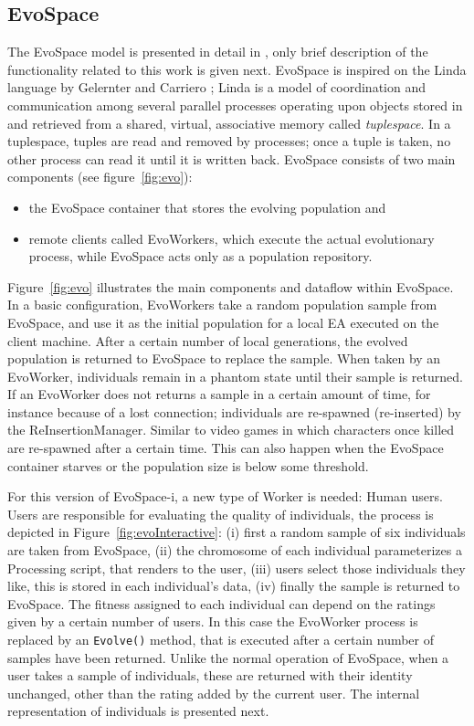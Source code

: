 \documentclass{sig-alternate}
\begin{document}
\subsection{EvoSpace} %
The EvoSpace model is presented in detail in \cite{EvoSpace}, only
brief description of the functionality related to this work is given
next.  EvoSpace is inspired on the Linda language by Gelernter and
Carriero \cite{linda}; Linda is a model of coordination and
communication among several parallel processes operating upon objects
stored in and retrieved from a shared, virtual, associative memory
called {\em tuplespace}. In a tuplespace, tuples are read and removed by processes; once a tuple is taken, no other process can read it until it is written back. EvoSpace consists of two main components (see figure~\ref{fig:evo}):\begin{itemize}
\item the EvoSpace container
that stores the evolving population and
\item remote clients called
EvoWorkers, %
which execute the actual evolutionary process, while EvoSpace acts
only as a population repository.

\end{itemize}
Figure~\ref{fig:evo} illustrates the main components and dataflow within EvoSpace.
In a basic configuration, EvoWorkers take a random population sample from EvoSpace, 
and use it as the initial population for a local EA
executed on the client machine. After a certain number of local generations, the
evolved population is returned to EvoSpace to replace the sample.
When taken by an EvoWorker,
individuals  remain in a phantom state until their sample is
returned. If an EvoWorker does not returns a sample in a certain
amount of time, for instance because of a lost connection; individuals
are re-spawned (re-inserted) by the ReInsertionManager. Similar to
video games in which characters once killed are re-spawned after a
certain time. This can also happen when the EvoSpace container starves
or the population size is below some threshold. 

For this version of EvoSpace-i, a new type of Worker is needed: Human users. Users are responsible for evaluating the quality of individuals, the process is depicted in Figure~\ref{fig:evoInteractive}: (i) first a random sample of six individuals are taken from EvoSpace, (ii) the chromosome of each individual parameterizes a Processing script, that renders to the user, (iii) users select those individuals they like, this is stored in each individual's data, (iv) finally the sample is returned to EvoSpace. The fitness assigned to each individual can depend on the ratings given by a certain number of users. In this case the EvoWorker process is replaced  by an \texttt{Evolve()} method, that is executed after a certain number of samples have been returned.
Unlike the normal operation of EvoSpace, when a user takes a sample of individuals, these are returned with their identity unchanged, other than the rating added by the current user. The internal representation of individuals is presented next.
\end{document}
